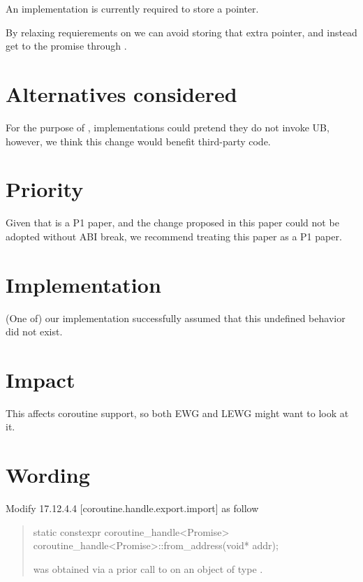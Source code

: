 \documentclass{wg21}
\begin{document}
An implementation is currently required to store a pointer.

By relaxing requierements on  we can avoid storing that extra pointer, and instead get to the promise through
.

\section{Alternatives considered}
For the purpose of , implementations could pretend they do not invoke UB, however, we think this change would benefit third-party code.

\section{Priority}

Given that  is a P1 paper, and the change proposed in this paper could not be adopted without ABI break,
we recommend treating this paper as a P1 paper.

\section{Implementation}

(One of) our  implementation successfully assumed that this undefined behavior did not exist.

\section{Impact}

This affects coroutine support, so both EWG and LEWG might want to look at it.

\section{Wording}

Modify 17.12.4.4 [coroutine.handle.export.import] as follow

\begin{quote}
%
\begin{itemdecl}
static constexpr coroutine_handle<Promise> coroutine_handle<Promise>::from_address(void* addr);
\end{itemdecl}

\begin{itemdescr}
\expects
{} was obtained via a prior call to 
on an object of type \cv {}.

\end{itemdescr}
\end{quote}
\end{document}

